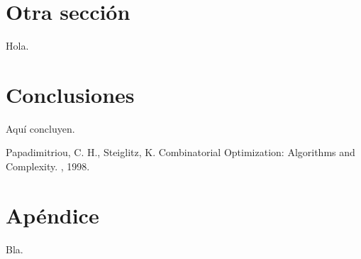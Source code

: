 \documentclass{ci5652}
\begin{document}
\section{Otra sección}

Hola.

\section*{Conclusiones}

Aquí concluyen.


\small


\begin{thebibliography}{99}

Papadimitriou, C. H., Steiglitz, K. 
\newblock Combinatorial Optimization: Algorithms and Complexity. 
, 1998.

\end{thebibliography}


\newpage
\section*{Apéndice}

Bla.
\end{document}
